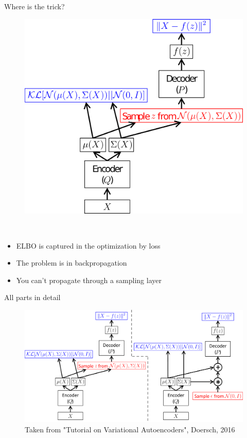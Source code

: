 \documentclass[10pt,aspectratio=169,handout]{beamer}
\begin{document}
\begin{frame}{Where is the trick?}
    \begin{minipage}[c]{0.3\textwidth}
            \begin{figure}
                \includegraphics[width=.9\textwidth]{figs/net.png}
            \end{figure}
    \end{minipage}
    ~
    \begin{minipage}[c]{0.6\textwidth}
        \begin{itemize}[<+(1)->]
            \item ELBO is captured in the optimization by loss
            \item The problem is in backpropagation
            \item You can't propagate through a sampling layer
        \end{itemize}
    \end{minipage}
    
\end{frame}

\begin{frame}{All parts in detail}
	\begin{center}
            \begin{figure}
                \includegraphics[width=.9\textwidth]{figs/net.pdf}
                \caption{Taken from "Tutorial on Variational Autoencoders", Doersch, 2016}
            \end{figure}
	\end{center}
\end{frame}
\end{document}
